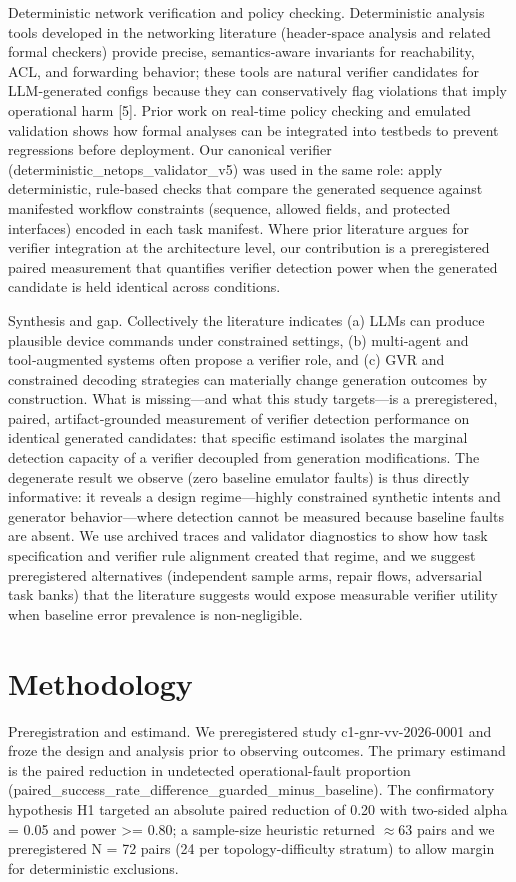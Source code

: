 \documentclass[conference]{IEEEtran}
\begin{document}
Deterministic network verification and policy checking. Deterministic analysis tools developed in the networking literature (header‑space analysis and related formal checkers) provide precise, semantics‑aware invariants for reachability, ACL, and forwarding behavior; these tools are natural verifier candidates for LLM‑generated configs because they can conservatively flag violations that imply operational harm [5]. Prior work on real‑time policy checking and emulated validation shows how formal analyses can be integrated into testbeds to prevent regressions before deployment. Our canonical verifier (deterministic\_netops\_validator\_v5) was used in the same role: apply deterministic, rule‑based checks that compare the generated sequence against manifested workflow constraints (sequence, allowed fields, and protected interfaces) encoded in each task manifest. Where prior literature argues for verifier integration at the architecture level, our contribution is a preregistered paired measurement that quantifies verifier detection power when the generated candidate is held identical across conditions.

Synthesis and gap. Collectively the literature indicates (a) LLMs can produce plausible device commands under constrained settings, (b) multi‑agent and tool‑augmented systems often propose a verifier role, and (c) GVR and constrained decoding strategies can materially change generation outcomes by construction. What is missing---and what this study targets---is a preregistered, paired, artifact‑grounded measurement of verifier detection performance on identical generated candidates: that specific estimand isolates the marginal detection capacity of a verifier decoupled from generation modifications. The degenerate result we observe (zero baseline emulator faults) is thus directly informative: it reveals a design regime---highly constrained synthetic intents and generator behavior---where detection cannot be measured because baseline faults are absent. We use archived traces and validator diagnostics to show how task specification and verifier rule alignment created that regime, and we suggest preregistered alternatives (independent sample arms, repair flows, adversarial task banks) that the literature suggests would expose measurable verifier utility when baseline error prevalence is non-negligible.

\section{Methodology}
Preregistration and estimand. We preregistered study c1-gnr-vv-2026-0001 and froze the design and analysis prior to observing outcomes. The primary estimand is the paired reduction in undetected operational-fault proportion (paired\_success\_rate\_difference\_guarded\_minus\_baseline). The confirmatory hypothesis H1 targeted an absolute paired reduction of 0.20 with two-sided alpha = 0.05 and power >= 0.80; a sample-size heuristic returned \ensuremath{\approx}63 pairs and we preregistered N = 72 pairs (24 per topology-difficulty stratum) to allow margin for deterministic exclusions.
\end{document}
